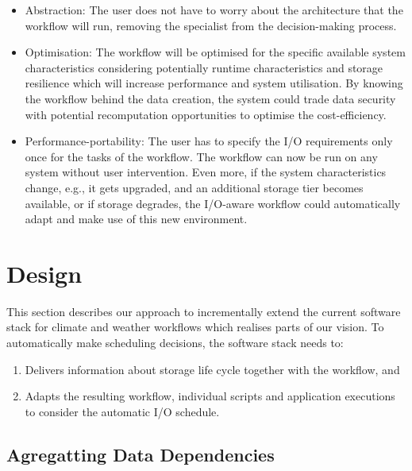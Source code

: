 \documentclass[a4paper]{article}
\begin{document}
\begin{itemize}
\item Abstraction: The user does not have to worry about the architecture that the workflow will run, removing the specialist from the decision-making process.

\item Optimisation: The workflow will be optimised for the specific available system characteristics considering potentially runtime characteristics and storage resilience which will increase performance and system utilisation.
By knowing the workflow behind the data creation, the system could trade data security with potential recomputation opportunities to optimise the cost-efficiency.

\item Performance-portability: The user has to specify the I/O requirements only once for the tasks of the workflow.
The workflow can now be run on any system without user intervention.
Even more, if the system characteristics change, e.g., it gets upgraded, and an additional storage tier becomes available, or if storage degrades, the I/O-aware workflow could automatically adapt and make use of this new environment.

\end{itemize}


\section{Design}

This section describes our approach to incrementally extend the current software stack for climate and weather workflows which realises parts of our vision.
To automatically make scheduling decisions, the software stack needs to:

\begin{enumerate}

\item Delivers information about storage life cycle together with the workflow, and

\item Adapts the resulting workflow, individual scripts and application executions to consider the automatic I/O schedule.

\end{enumerate}

\subsection{Agregatting Data Dependencies}
\end{document}
